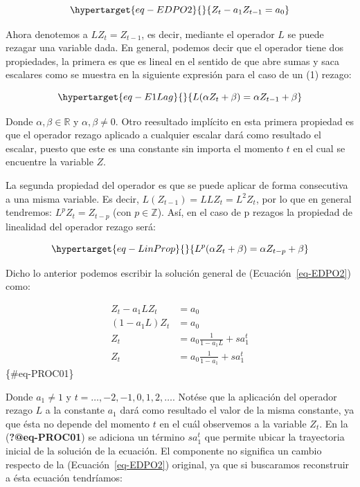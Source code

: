 \documentclass[
  a4paper,
]{article}
\begin{document}
\begin{equation}\protect\hypertarget{eq-EDPO2}{}{
Z_t - a_1 Z_{t-1} = a_0
}\label{eq-EDPO2}\end{equation}

Ahora denotemos a \(L Z_t = Z_{t-1}\), es decir, mediante el operador
\(L\) se puede rezagar una variable dada. En general, podemos decir que
el operador tiene dos propiedades, la primera es que es lineal en el
sentido de que abre sumas y saca escalares como se muestra en la
siguiente expresión para el caso de un (1) rezago:

\begin{equation}\protect\hypertarget{eq-E1Lag}{}{
L(\alpha Z_{t} + \beta) = \alpha Z_{t-1} + \beta
}\label{eq-E1Lag}\end{equation}

Donde \(\alpha, \beta \in \mathbb{R}\) y \(\alpha, \beta \neq 0\). Otro
reesultado implícito en esta primera propiedad es que el operador rezago
aplicado a cualquier escalar dará como resultado el escalar, puesto que
este es una constante sin importa el momento \(t\) en el cual se
encuentre la variable \(Z\).

La segunda propiedad del operador es que se puede aplicar de forma
consecutiva a una misma variable. Es decir,
\(L ( Z_{t-1}) = L L Z_{t} = L^2 Z_{t}\), por lo que en general
tendremos: \(L^p Z_t = Z_{t-p}\) (con \(p \in \mathbb{Z}\)). Así, en el
caso de p rezagos la propiedad de linealidad del operador rezago será:

\begin{equation}\protect\hypertarget{eq-LinProp}{}{
L^p (\alpha Z_{t} + \beta) = \alpha Z_{t-p} + \beta
}\label{eq-LinProp}\end{equation}

Dicho lo anterior podemos escribir la solución general de
(Ecuación~\ref{eq-EDPO2}) como:

\begin{align}
Z_t - a_1 L Z_t & = a_0 \nonumber \\
(1 - a_1 L)Z_t & = a_0 \nonumber \\
Z_t & = a_0 \frac{1}{1 - a_1 L} + s a^t_1 \nonumber \\
Z_t & = a_0 \frac{1}{1 - a_1} + s a^t_1
\end{align} \{\#eq-PROC01\}

Donde \(a_1 \neq 1\) y \(t = \ldots, -2, -1, 0, 1, 2, \ldots\). Notése
que la aplicación del operador rezago \(L\) a la constante \(a_1\) dará
como resultado el valor de la misma constante, ya que ésta no depende
del momento \(t\) en el cuál observemos a la variable \(Z_t\). En la
(\textbf{?@eq-PROC01}) se adiciona un término \(s a^t_1\) que permite
ubicar la trayectoria inicial de la solución de la ecuación. El
componente no significa un cambio respecto de la
(Ecuación~\ref{eq-EDPO2}) original, ya que si buscaramos reconstruir a
ésta ecuación tendríamos:
\end{document}
